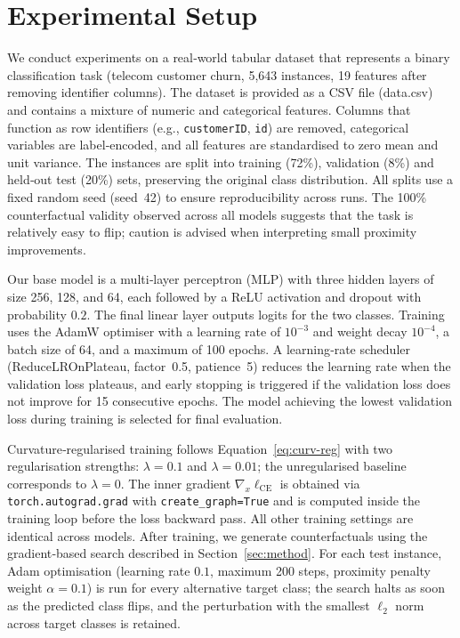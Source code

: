\documentclass[11pt,a4paper]{article}
\begin{document}
\section{Experimental Setup}
\label{sec:setup}
We conduct experiments on a real‑world tabular dataset that represents a binary classification task (telecom customer churn, 5,643 instances, 19 features after removing identifier columns). The dataset is provided as a CSV file (data.csv) and contains a mixture of numeric and categorical features. Columns that function as row identifiers (e.g., \texttt{customerID}, \texttt{id}) are removed, categorical variables are label‑encoded, and all features are standardised to zero mean and unit variance. The instances are split into training (72\%), validation (8\%) and held‑out test (20\%) sets, preserving the original class distribution. All splits use a fixed random seed (seed~42) to ensure reproducibility across runs. The 100\% counterfactual validity observed across all models suggests that the task is relatively easy to flip; caution is advised when interpreting small proximity improvements.

Our base model is a multi‑layer perceptron (MLP) with three hidden layers of size 256, 128, and 64, each followed by a ReLU activation and dropout with probability \(0.2\). The final linear layer outputs logits for the two classes. Training uses the AdamW optimiser with a learning rate of \(10^{-3}\) and weight decay \(10^{-4}\), a batch size of 64, and a maximum of 100 epochs. A learning‑rate scheduler (ReduceLROnPlateau, factor~0.5, patience~5) reduces the learning rate when the validation loss plateaus, and early stopping is triggered if the validation loss does not improve for 15 consecutive epochs. The model achieving the lowest validation loss during training is selected for final evaluation.

Curvature‑regularised training follows Equation~\eqref{eq:curv-reg} with two regularisation strengths: \(\lambda = 0.1\) and \(\lambda = 0.01\); the unregularised baseline corresponds to \(\lambda = 0\). The inner gradient \(\nabla_x \ell_{\mathrm{CE}}\) is obtained via \texttt{torch.autograd.grad} with \texttt{create\_graph=True} and is computed inside the training loop before the loss backward pass. All other training settings are identical across models. After training, we generate counterfactuals using the gradient‑based search described in Section~\ref{sec:method}. For each test instance, Adam optimisation (learning rate \(0.1\), maximum 200 steps, proximity penalty weight \(\alpha = 0.1\)) is run for every alternative target class; the search halts as soon as the predicted class flips, and the perturbation with the smallest \(\ell_2\) norm across target classes is retained.
\end{document}

